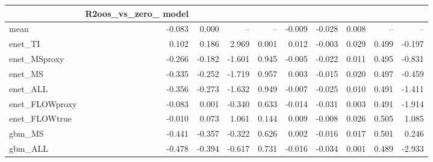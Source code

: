 \begin{tabular}{lrrrrrrrrr}
\toprule
 & R2oos_vs_zero_%
model &  &  &  &  &  &  &  &  &  \\
\midrule
mean & -0.083 & 0.000 & -- & -- & -0.009 & -0.028 & 0.008 & -- & -- \\
enet_TI & 0.102 & 0.186 & 2.969 & 0.001 & 0.012 & -0.003 & 0.029 & 0.499 & -0.197 \\
enet_MSproxy & -0.266 & -0.182 & -1.601 & 0.945 & -0.005 & -0.022 & 0.011 & 0.495 & -0.831 \\
enet_MS & -0.335 & -0.252 & -1.719 & 0.957 & 0.003 & -0.015 & 0.020 & 0.497 & -0.459 \\
enet_ALL & -0.356 & -0.273 & -1.632 & 0.949 & -0.007 & -0.025 & 0.010 & 0.491 & -1.411 \\
enet_FLOWproxy & -0.083 & 0.001 & -0.340 & 0.633 & -0.014 & -0.031 & 0.003 & 0.491 & -1.914 \\
enet_FLOWtrue & -0.010 & 0.073 & 1.061 & 0.144 & 0.009 & -0.008 & 0.026 & 0.505 & 1.085 \\
gbm_MS & -0.441 & -0.357 & -0.322 & 0.626 & 0.002 & -0.016 & 0.017 & 0.501 & 0.246 \\
gbm_ALL & -0.478 & -0.394 & -0.617 & 0.731 & -0.016 & -0.034 & 0.001 & 0.489 & -2.933 \\
\bottomrule
\end{tabular}
